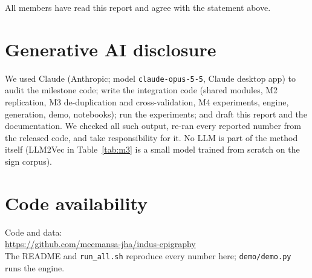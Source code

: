 \documentclass[11pt,a4paper,twocolumn]{article}
\newcommand{\githuburl}{https://github.com/meemansa-jha/indus-epigraphy}
\begin{document}
\smallskip
\noindent All members have read this report and agree with the statement above.

\section*{Generative AI disclosure}
We used Claude (Anthropic; model \texttt{claude-opus-5-5}, Claude desktop app) to audit the milestone
code; write the integration code (shared modules, M2 replication, M3 de-duplication and
cross-validation, M4 experiments, engine, generation, demo, notebooks); run the experiments; and draft
this report and the documentation. We checked all such output, re-ran every reported number from the released
code, and take responsibility for it. No LLM is part of the method itself (LLM2Vec in Table~\ref{tab:m3}
is a small model trained from scratch on the sign corpus).

\section*{Code availability}
\noindent Code and data:\\
\url{\githuburl}\\
The README and \texttt{run\_all.sh} reproduce every number here; \texttt{demo/demo.py} runs the engine.
\end{document}
